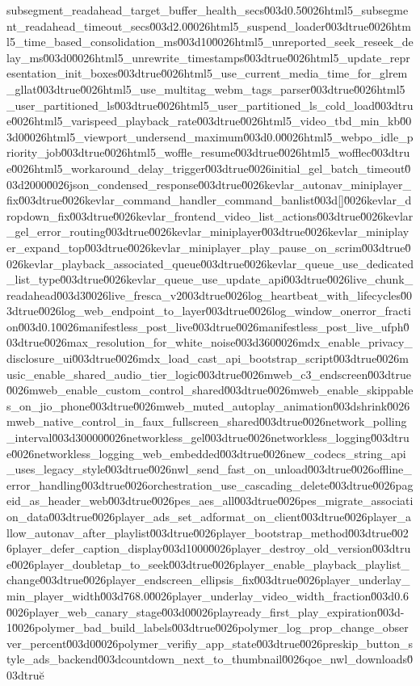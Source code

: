 {subsegment_readahead_target_buffer_health_secs\u003d0.5\u0026html5_subsegment_readahead_timeout_secs\u003d2.0\u0026html5_suspend_loader\u003dtrue\u0026html5_time_based_consolidation_ms\u003d10\u0026html5_unreported_seek_reseek_delay_ms\u003d0\u0026html5_unrewrite_timestamps\u003dtrue\u0026html5_update_representation_init_boxes\u003dtrue\u0026html5_use_current_media_time_for_glrem_gllat\u003dtrue\u0026html5_use_multitag_webm_tags_parser\u003dtrue\u0026html5_user_partitioned_ls\u003dtrue\u0026html5_user_partitioned_ls_cold_load\u003dtrue\u0026html5_varispeed_playback_rate\u003dtrue\u0026html5_video_tbd_min_kb\u003d0\u0026html5_viewport_undersend_maximum\u003d0.0\u0026html5_webpo_idle_priority_job\u003dtrue\u0026html5_woffle_resume\u003dtrue\u0026html5_wofflec\u003dtrue\u0026html5_workaround_delay_trigger\u003dtrue\u0026initial_gel_batch_timeout\u003d2000\u0026json_condensed_response\u003dtrue\u0026kevlar_autonav_miniplayer_fix\u003dtrue\u0026kevlar_command_handler_command_banlist\u003d[]\u0026kevlar_dropdown_fix\u003dtrue\u0026kevlar_frontend_video_list_actions\u003dtrue\u0026kevlar_gel_error_routing\u003dtrue\u0026kevlar_miniplayer\u003dtrue\u0026kevlar_miniplayer_expand_top\u003dtrue\u0026kevlar_miniplayer_play_pause_on_scrim\u003dtrue\u0026kevlar_playback_associated_queue\u003dtrue\u0026kevlar_queue_use_dedicated_list_type\u003dtrue\u0026kevlar_queue_use_update_api\u003dtrue\u0026live_chunk_readahead\u003d3\u0026live_fresca_v2\u003dtrue\u0026log_heartbeat_with_lifecycles\u003dtrue\u0026log_web_endpoint_to_layer\u003dtrue\u0026log_window_onerror_fraction\u003d0.1\u0026manifestless_post_live\u003dtrue\u0026manifestless_post_live_ufph\u003dtrue\u0026max_resolution_for_white_noise\u003d360\u0026mdx_enable_privacy_disclosure_ui\u003dtrue\u0026mdx_load_cast_api_bootstrap_script\u003dtrue\u0026music_enable_shared_audio_tier_logic\u003dtrue\u0026mweb_c3_endscreen\u003dtrue\u0026mweb_enable_custom_control_shared\u003dtrue\u0026mweb_enable_skippables_on_jio_phone\u003dtrue\u0026mweb_muted_autoplay_animation\u003dshrink\u0026mweb_native_control_in_faux_fullscreen_shared\u003dtrue\u0026network_polling_interval\u003d30000\u0026networkless_gel\u003dtrue\u0026networkless_logging\u003dtrue\u0026networkless_logging_web_embedded\u003dtrue\u0026new_codecs_string_api_uses_legacy_style\u003dtrue\u0026nwl_send_fast_on_unload\u003dtrue\u0026offline_error_handling\u003dtrue\u0026orchestration_use_cascading_delete\u003dtrue\u0026pageid_as_header_web\u003dtrue\u0026pes_aes_all\u003dtrue\u0026pes_migrate_association_data\u003dtrue\u0026player_ads_set_adformat_on_client\u003dtrue\u0026player_allow_autonav_after_playlist\u003dtrue\u0026player_bootstrap_method\u003dtrue\u0026player_defer_caption_display\u003d1000\u0026player_destroy_old_version\u003dtrue\u0026player_doubletap_to_seek\u003dtrue\u0026player_enable_playback_playlist_change\u003dtrue\u0026player_endscreen_ellipsis_fix\u003dtrue\u0026player_underlay_min_player_width\u003d768.0\u0026player_underlay_video_width_fraction\u003d0.6\u0026player_web_canary_stage\u003d0\u0026playready_first_play_expiration\u003d-1\u0026polymer_bad_build_labels\u003dtrue\u0026polymer_log_prop_change_observer_percent\u003d0\u0026polymer_verifiy_app_state\u003dtrue\u0026preskip_button_style_ads_backend\u003dcountdown_next_to_thumbnail\u0026qoe_nwl_downloads\u003dtrue\u}
